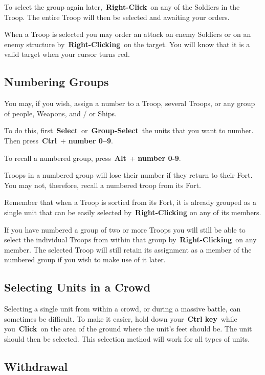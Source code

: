 To select the group again later, \textbf{Right-Click} on any of the Soldiers in the Troop. The entire Troop will then be selected and awaiting your orders.

When a Troop is selected you may order an attack on enemy Soldiers or on an enemy structure by \textbf{Right-Clicking} on the target. You will know that it is a valid target when your cursor turns red.

\subsection{Numbering Groups}

You may, if you wish, assign a number to a Troop, several Troops, or any group of people, Weapons, and / or Ships.

To do this, first \textbf{Select} or \textbf{Group-Select} the units that you want to number. Then press \textbf{Ctrl} + \textbf{number 0–9}.

To recall a numbered group, press \textbf{Alt} + \textbf{number 0-9}.

Troops in a numbered group will lose their number if they return to their Fort. You may not, therefore, recall a numbered troop from its Fort.

Remember that when a Troop is sortied from its Fort, it is already grouped as a single unit that can be easily selected by \textbf{Right-Clicking} on any of its members.

If you have numbered a group of two or more Troops you will still be able to select the individual Troops from within that group by \textbf{Right-Clicking} on any member. The selected Troop will still retain its assignment as a member of the numbered group if you wish to make use of it later.

\subsection{Selecting Units in a Crowd}

Selecting a single unit from within a crowd, or during a massive battle, can sometimes be difficult. To make it easier, hold down your \textbf{Ctrl key} while you \textbf{Click} on the area of the ground where the unit’s feet should be. The unit should then be selected. This selection method will work for all types of units.

\subsection{Withdrawal}

